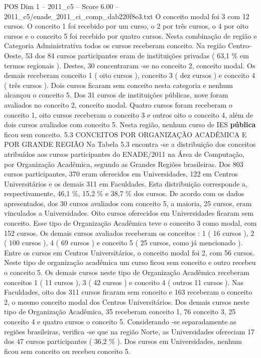 \begin{textsample}{POS Dim 1 – 2011\_c5 – Score 6.00 – 2011\_c5/enade\_2011\_ci\_comp\_dab220f8e3.txt}
O conceito modal foi 3 com 12 cursos.
O conceito 1 foi recebido por um curso, o 2 por três cursos, o 4 por oito cursos e o conceito 5 foi recebido por quatro cursos.
Nesta combinação de região e Categoria Administrativa todos os cursos receberam conceito.
Na região Centro-Oeste, 53 dos 84 cursos participantes eram de instituições privadas ( 63,1 \% em termos regionais ).
Destes, 30 concentraram -se no conceito 2, conceito modal.
Os demais receberam conceito 1 ( oito cursos ), conceito 3 ( dez cursos ) e conceito 4 ( três cursos ).
Dois cursos ficaram sem conceito nesta categoria e nenhum alcançou o conceito 5.
Dos 31 cursos de instituições públicas, nove foram avaliados no conceito 2, conceito modal.
Quatro cursos foram receberam o conceito 1, oito cursos receberam o conceito 3 e outros oito o conceito 4, além de dois cursos avaliados com conceito 5.
Nesta região, nenhum curso de IES \textbf{pública} ficou sem conceito. 5.3 CONCEITOS POR ORGANIZAÇÃO ACADÊMICA E POR GRANDE REGIÃO Na Tabela 5.3 encontra -se a distribuição dos conceitos atribuídos aos cursos participantes do ENADE/2011 na Área de Computação, por Organização Acadêmica, segundo as Grandes Regiões brasileiras.
Dos 803 cursos participantes, 370 eram oferecidos em Universidades, 122 em Centros Universitários e os demais 311 em Faculdades.
Esta distribuição corresponde a, respectivamente, 46,1 \%, 15,2 \% e 38,7 \% dos cursos.
De acordo com os dados apresentados, dos 30 cursos avaliados com conceito 5, a maioria, 25 cursos, eram vinculados a Universidades.
Oito cursos oferecidos em Universidades ficaram sem conceito.
Esse tipo de Organização Acadêmica teve o conceito 3 como modal, com 152 cursos.
Os demais cursos avaliados receberam os conceitos : 1 ( 16 cursos ), 2 ( 100 cursos ), 4 ( 69 cursos ) e conceito 5 ( 25 cursos, como já mencionado ).
Entre os cursos em Centros Universitários, o conceito modal foi 2, com 56 cursos.
Neste tipo de organização acadêmica um curso ficou sem conceito e outro recebeu o conceito 5.
Os demais cursos neste tipo de Organização Acadêmica receberam conceitos 1 ( 11 cursos ), 3 ( 42 cursos ) e conceito 4 ( outros 11 cursos ).
Nas Faculdades, oito dos 311 cursos ficaram sem conceito e 163 receberam o conceito 2, o mesmo conceito modal dos Centros Universitários.
Dos demais cursos neste tipo de Organização Acadêmica, 35 receberam conceito 1, 76 conceito 3, 25 conceito 4 e quatro cursos o conceito 5.
Considerando -se separadamente as regiões brasileiras, verifica -se que na região Norte, as Universidades ofereciam 17 dos 47 cursos participantes ( 36,2 \% ).
Dos cursos em Universidades, nenhum ficou sem conceito ou recebeu conceito 5.

\end{textsample}
